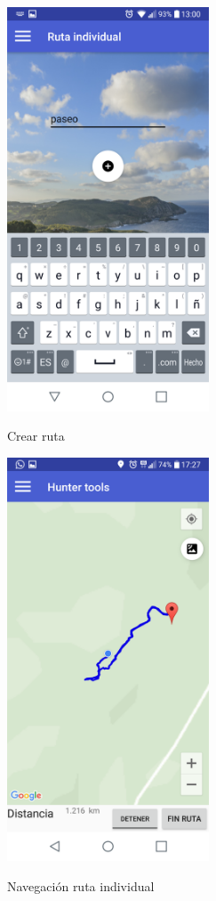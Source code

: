 \begin{figure}[htbp]
\begin{minipage}[b]{0.5\linewidth} %
\centering
\includegraphics[width=6cm]{capturamovil/crearruta.png}
 \label{figura1}
\caption{Crear ruta}

\end{minipage}
\hspace{0.5cm} %
\begin{minipage}[b]{0.5\linewidth}
\centering
\includegraphics[width=6cm]{capturamovil/individual-navegacion.png}
 \label{figura2}
\caption{Navegación ruta individual }

\end{minipage}
\end{figure}



